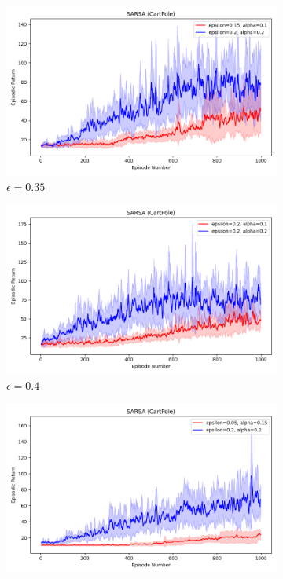 \documentclass[11pt, a4]{article}
\begin{document}
\begin{figure}[h]
				\vspace{0.1cm}
				
				\begin{subfigure}[h]{0.3\textwidth}
					\centering
					\includegraphics[width=\textwidth]{../cartpole-v1/plots/sarsa_0.1_0.15vs0.2_0.2.png}
					\caption{$\epsilon = 0.35$}
				\end{subfigure}
				\hfill
				\begin{subfigure}[h]{0.3\textwidth}
					\centering
					\includegraphics[width=\textwidth]{../cartpole-v1/plots/sarsa_0.1_0.2vs0.2_0.2.png}
					\caption{$\epsilon = 0.4$}
				\end{subfigure}
				\hfill
				\begin{subfigure}[h]{0.3\textwidth}
					\centering
					\includegraphics[width=\textwidth]{../cartpole-v1/plots/sarsa_0.15_0.05vs0.2_0.2.png}

\end{subfigure}
\end{figure}
\end{document}
